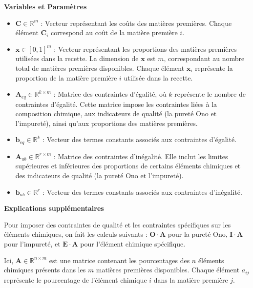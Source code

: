 \documentclass[12pt]{article}
\begin{document}
\textbf{Variables et Paramètres }


\begin{itemize}[label=\textbullet]
    \item \textbf{$\mathbf{C} \in \mathbb{R}^m$} : Vecteur représentant 
    les coûts des matières premières. Chaque élément $\mathbf{C}_i$ 
    correspond au coût de la matière première $i$.

    \item \textbf{$\mathbf{x} \in [0, 1]^m$} : Vecteur représentant les 
    proportions des matières premières utilisées dans la recette. La 
    dimension de $\mathbf{x}$ est $m$, correspondant au nombre total de matières premières disponibles. Chaque élément $\mathbf{x}_i$ représente la proportion de la matière première $i$ utilisée dans la recette.

    \item \textbf{$\mathbf{A}_{eq} \in \mathbb{R}^{k \times m}$} : Matrice 
    des contraintes d'égalité, où $k$ représente le nombre de contraintes 
    d'égalité. Cette matrice impose les contraintes liées à la composition 
    chimique, aux indicateurs de qualité (la pureté Ono et l'impureté), 
    ainsi qu'aux proportions des matières premières.

    \item \textbf{$\mathbf{b}_{eq} \in \mathbb{R}^k$} : Vecteur des termes 
    constants associés aux contraintes d'égalité.

    \item \textbf{$\mathbf{A}_{ub} \in \mathbb{R}^{r \times m}$} : Matrice 
    des contraintes d'inégalité. Elle inclut les limites supérieures et 
    inférieures des proportions de certains éléments chimiques et des 
    indicateurs de qualité (la pureté Ono et l'impureté).

    \item \textbf{$\mathbf{b}_{ub} \in \mathbb{R}^r$} : Vecteur des termes 
    constants associés aux contraintes d'inégalité.
\end{itemize}




\textbf{Explications supplémentaires}


Pour imposer des contraintes de qualité et les contraintes spécifiques sur les éléments 
chimiques, on fait les calculs suivants : $\mathbf{O} \cdot \mathbf{A}$
pour la pureté Ono, $\mathbf{I} \cdot \mathbf{A}$ pour l'impureté,
et  $\mathbf{E} \cdot \mathbf{A}$ pour l'élément chimique spécifique.


Ici, $\mathbf{A} \in \mathbb{R}^{n \times m}$ est une matrice contenant 
les pourcentages des $n$ éléments chimiques présents dans les $m$ matières 
premières disponibles. Chaque élément $a_{ij}$ représente le pourcentage 
de l'élément chimique $i$ dans la matière première $j$.
\end{document}
